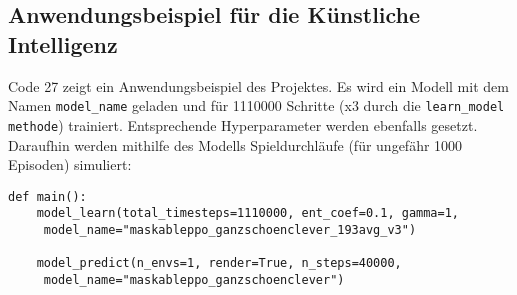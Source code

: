 \subsection{Anwendungsbeispiel für die Künstliche Intelligenz}
\begin{minipage}{\linewidth}
Code 27 zeigt ein Anwendungsbeispiel des Projektes. Es wird ein Modell mit dem Namen \texttt{model\_name} geladen und für 1110000 Schritte (x3 durch die \texttt{learn\_model methode}) trainiert. Entsprechende Hyperparameter werden ebenfalls gesetzt. Daraufhin werden mithilfe des Modells Spieldurchläufe (für ungefähr 1000 Episoden) simuliert:
\vspace{0.5cm}
\begin{lstlisting}[caption={Anwendungsbeispiel für die Künstliche Intelligenz}]
def main():
	model_learn(total_timesteps=1110000, ent_coef=0.1, gamma=1, 
	 model_name="maskableppo_ganzschoenclever_193avg_v3")
	
	model_predict(n_envs=1, render=True, n_steps=40000,
	 model_name="maskableppo_ganzschoenclever")
\end{lstlisting}
\end{minipage}